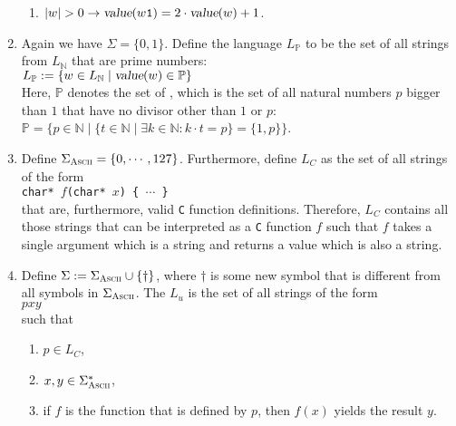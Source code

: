 \begin{enumerate}
\begin{enumerate}
      \item $|w| > 0 \rightarrow \textsl{value}(w\mathtt{1}) = 2 \cdot \textsl{value}(w) + 1$.
      \end{enumerate}
\item Again we have $\Sigma = \{0,1\}$. Define the language $L_\mathbb{P}$
      to be the set of all strings from $L_\mathbb{N}$ that are prime numbers:
      \\[0.2cm]
      \hspace*{1.3cm}
      $L_\mathbb{P} := \{ w \in L_\mathbb{N} \mid \textsl{value}(w) \in \mathbb{P} \}$
      \\[0.2cm]
      Here, $\mathbb{P}$ denotes the set of ,  which is the set of all natural
      numbers $p$ bigger than $1$ that have no divisor other than $1$ or $p$:
      \\[0.2cm]
      \hspace*{1.3cm}
      $\mathbb{P} = \bigl\{ p \in \mathbb{N} \;\big|\; \{ t \in \mathbb{N} \mid \exists k \in
      \mathbb{N} : k \cdot t = p \} = \{1, p\} \bigr\}$.
\item Define $\Sigma_{\textsc{\scriptsize Ascii}} = \{ 0, \cdots, 127\}$.  Furthermore, define $L_C$
      as the set of all strings of the form
      \\[0.2cm]
      \hspace*{1.3cm}
      \texttt{char* $f$(char* $x$) \{ $\cdots$ \}}
      \\[0.2cm]
      that are, furthermore, valid \texttt{C} function definitions.
      Therefore,  $L_C$ contains all those strings that can be interpreted as a \texttt{C} function $f$
      such that $f$ takes a single argument which is a string and returns a value which is also a
      string.
\item Define $\Sigma := \Sigma_{\textsc{\scriptsize Ascii}} \cup \{\dag\}$, where
      $\mathtt{\dag}$ is some new symbol that is different from all symbols in
      $\Sigma_{\textsc{\scriptsize Ascii}}$.
      The   $L_u$ is the set of all strings of the form
      \\[0.2cm]
      \hspace*{1.3cm}
      $p$\dag$x$\dag$y$
      \\[0.2cm]
      such that
      \begin{enumerate}
      \item $p \in L_C$,
      \item $x,y \in \Sigma_{\textsc{Ascii}}^*$,
      \item if $f$ is the function that is defined by $p$, then $f(x)$ yields the result $y$.
            \eox
      \end{enumerate}
    \end{enumerate}

